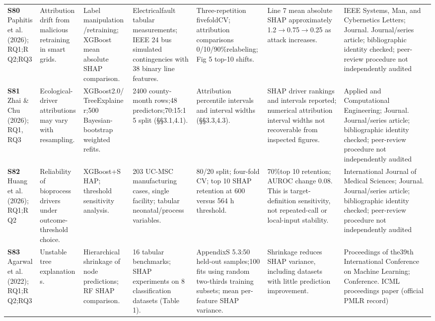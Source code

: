 \begin{longtable}{@{}P{1.55cm}P{2.9cm}P{4.5cm}P{3.2cm}P{3.4cm}P{4.6cm}P{3.6cm}@{}}
\textbf{S80} \cite{S80} Paphitis et al. (2026); RQ1;RQ2;RQ3 & Attribution drift from malicious retraining in smart grids. & Label manipulation/\allowbreak{}retraining; XGBoost mean absolute SHAP comparison. & Electricalfault tabular measurements; IEEE 24 bus simulated contingencies with 38 binary line features. & Three-repetition fivefoldCV; attribution comparisons 0/\allowbreak{}10/\allowbreak{}90\%relabeling; Fig 5 top-10 shifts. & Line 7 mean absolute SHAP approximately 1.2$\rightarrow$0.75$\rightarrow$0.25 as attack increases. & IEEE Systems, Man, and Cybernetics Letters; Journal. Journal/\allowbreak{}series article; bibliographic identity checked; peer-review procedure not independently audited \\
\textbf{S81} \cite{S81} Zhai \& Chu (2026); RQ1, RQ3 & Ecological-driver attributions may vary with resampling. & XGBoost2.0/\allowbreak{}TreeExplainer;500 Bayesian-bootstrap weighted refits. & 2400 county-month rows;48 predictors;70:15:15 split (§§3.1,4.1). & Attribution percentile intervals and interval widths (§§3.3,4.3). & SHAP driver rankings and intervals reported; numerical attribution interval widths not recoverable from inspected figures. & Applied and Computational Engineering; Journal. Journal/\allowbreak{}series article; bibliographic identity checked; peer-review procedure not independently audited \\
\textbf{S82} \cite{S82} Huang et al. (2026); RQ1;RQ2 & Reliability of bioprocess drivers under outcome-threshold choice. & XGBoost+SHAP; threshold sensitivity analysis. & 203 UC-MSC manufacturing cases, single facility; tabular neonatal/\allowbreak{}process variables. & 80/\allowbreak{}20 split; four-fold CV; top 10 SHAP retention at 600 versus 564 h threshold. & 70\%top 10 retention; AUROC change 0.08. This is target-definition sensitivity, not repeated-call or local-input stability. & International Journal of Medical Sciences; Journal. Journal/\allowbreak{}series article; bibliographic identity checked; peer-review procedure not independently audited \\
\textbf{S83} \cite{S83} Agarwal et al. (2022); RQ1;RQ2;RQ3 & Unstable tree explanations. & Hierarchical shrinkage of node predictions; RF SHAP comparison. & 16 tabular benchmarks; SHAP experiments on 8 classification datasets (Table 1). & AppendixS 5.3:50 held-out samples;100 fits using random two-thirds training subsets; mean per-feature SHAP variance. & Shrinkage reduces SHAP variance, including datasets with little prediction improvement. & Proceedings of the39th International Conference on Machine Learning; Conference. ICML proceedings paper (official PMLR record) \\

\end{longtable}
